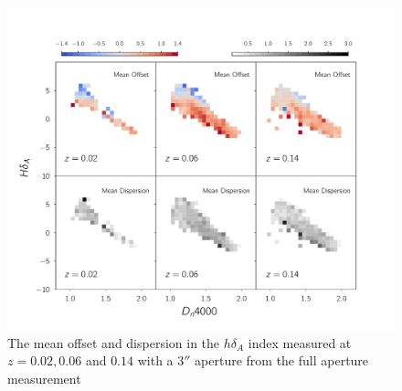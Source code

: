 \begin{figure}
\includegraphics[width=\textwidth]{figures/hdelta_full_aperture_comparisons.pdf}
\caption[Short figure name.]{ The mean offset and dispersion in the $h\delta_{A}$ index measured at $z = 0.02,0.06$ and $0.14$ with a $3''$ aperture from the full aperture measurement 
\label{fig:myInlineFigure}}
\end{figure}



